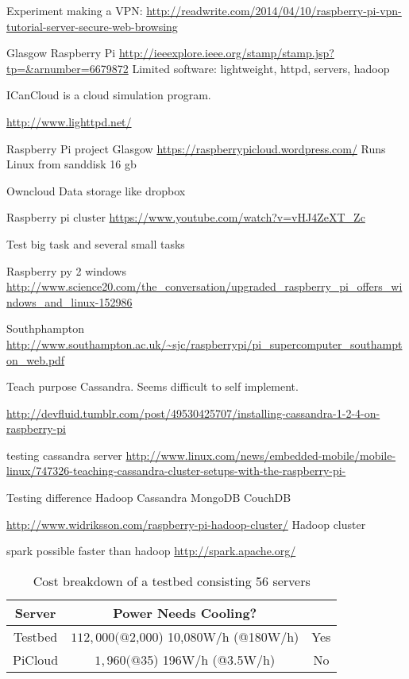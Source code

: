 \documentclass{sig-alternate-br}
\begin{document}
Experiment making a VPN:
\url{http://readwrite.com/2014/04/10/raspberry-pi-vpn-tutorial-server-secure-web-browsing}

Glasgow Raspberry Pi
\url{http://ieeexplore.ieee.org/stamp/stamp.jsp?tp=&arnumber=6679872}
Limited software:
lightweight,
httpd,
servers, 
hadoop

ICanCloud is a cloud simulation program.


\url{http://www.lighttpd.net/}

Raspberry Pi project Glasgow
\url{https://raspberrypicloud.wordpress.com/}
Runs Linux from sanddisk 16 gb

Owncloud
Data storage like dropbox

Raspberry pi cluster
\url{https://www.youtube.com/watch?v=vHJ4ZeXT_Zc}


Test big task and several small tasks

Raspberry py 2 windows
\url{http://www.science20.com/the_conversation/upgraded_raspberry_pi_offers_windows_and_linux-152986}

Southphampton
\url{http://www.southampton.ac.uk/~sjc/raspberrypi/pi_supercomputer_southampton_web.pdf}

Teach purpose Cassandra. Seems difficult to self implement.

\url{http://devfluid.tumblr.com/post/49530425707/installing-cassandra-1-2-4-on-raspberry-pi}

testing cassandra server
\url{http://www.linux.com/news/embedded-mobile/mobile-linux/747326-teaching-cassandra-cluster-setups-with-the-raspberry-pi-}


Testing difference
Hadoop
Cassandra
MongoDB
CouchDB


\url{http://www.widriksson.com/raspberry-pi-hadoop-cluster/}
Hadoop cluster

spark possible faster than hadoop
\url{http://spark.apache.org/}



\begin{table}
	\centering \caption{Cost breakdown of a testbed consisting 56 servers} 

\begin{tabular}{|c|c|c|} \hline
\textbf{Server}&  \textbf{Power} \textbf{Needs Cooling?} \\ \hline
Testbed  & $112,000 (@$2,000) 10,080W/h (@180W/h) & Yes \\ \hline
PiCloud & $1,960 (@$35) 196W/h (@3.5W/h) & No \\ \hline
\end{tabular}
\label{tab:cost}
\end{table}
\end{document}
